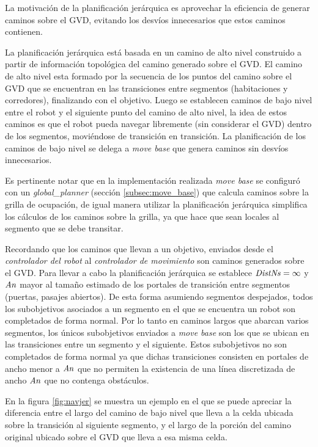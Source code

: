 La motivación de la planificación jerárquica es aprovechar la eficiencia de
generar caminos sobre el GVD, evitando los desvíos innecesarios que estos
caminos contienen.

La planificación jerárquica está basada en un camino de alto nivel construido a
partir de información topológica del camino generado sobre el GVD.
El camino de alto nivel esta formado por la secuencia de los puntos del camino sobre
el GVD que se encuentran en las transiciones entre segmentos (habitaciones
y corredores), finalizando con el objetivo. Luego se establecen caminos de bajo
nivel entre el robot y el siguiente punto del camino de alto nivel, la idea de
estos caminos es que el robot pueda navegar libremente (sin considerar el GVD)
dentro de los segmentos, moviéndose de transición en transición. La
planificación de los caminos de bajo nivel se delega a \emph{move base} que
genera caminos sin desvíos innecesarios.

Es pertinente notar que en la implementación realizada \emph{move base} se
configuró con un \emph{global\_planner} (sección \ref{subsec:move_base}) que
calcula caminos sobre la grilla de ocupación, de igual manera utilizar la
planificación jerárquica simplifica los cálculos de los caminos sobre la grilla,
ya que hace que sean locales al segmento que se debe transitar. %

Recordando que los caminos que llevan a un objetivo, enviados desde el
\emph{controlador del robot} al \emph{controlador de movimiento} son caminos
generados sobre el GVD. Para llevar a cabo la planificación jerárquica se
establece $\mathit{DistNs}=\infty$ y $\mathit{An}$ mayor al tamaño estimado de los
portales de transición entre segmentos (puertas, pasajes abiertos). De esta
forma asumiendo segmentos despejados, todos los subobjetivos asociados a un
segmento en el que se encuentra un robot son completados de forma normal. Por
lo tanto en caminos largos que abarcan varios segmentos, los únicos
subobjetivos enviados a \emph{move base} son los que se ubican en las
transiciones entre un segmento y el siguiente. Estos subobjetivos no son
completados de forma normal ya que dichas transiciones consisten en portales de
ancho menor a $\mathit{An}$ que no permiten la existencia de una línea discretizada
de ancho $\mathit{An}$ que no contenga obstáculos.

En la figura \ref{fig:navjer} se muestra un ejemplo en el que se puede apreciar
la diferencia entre el largo del camino de bajo nivel que lleva a la celda
ubicada sobre la transición al siguiente segmento, y el largo de la porción del
camino original ubicado sobre el GVD que lleva a esa misma celda.


